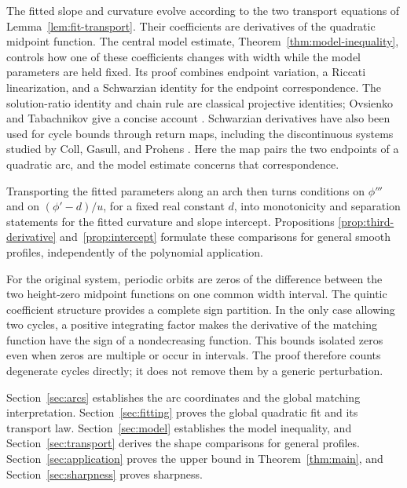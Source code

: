 The fitted slope and curvature evolve according to the two
transport equations of Lemma~\ref{lem:fit-transport}. Their
coefficients are derivatives of the quadratic midpoint function.
The central model estimate, Theorem~\ref{thm:model-inequality},
controls how one of these coefficients changes with width while
the model parameters are held fixed. Its proof combines endpoint
variation, a Riccati linearization, and a Schwarzian identity for
the endpoint correspondence. The solution-ratio identity and chain
rule are classical projective identities; Ovsienko and Tabachnikov
give a concise account \cite{OT}. Schwarzian derivatives have also
been used for cycle bounds through return maps, including the
discontinuous systems studied by Coll, Gasull, and Prohens
\cite{CGP}. Here the map pairs the two endpoints of a quadratic
arc, and the model estimate concerns that correspondence.

Transporting the fitted parameters along an arch then turns
conditions on $\phi'''$ and on $(\phi'-d)/u$, for a fixed real
constant $d$, into monotonicity and separation statements for the
fitted curvature and slope intercept. Propositions
\ref{prop:third-derivative} and~\ref{prop:intercept} formulate these
comparisons for general smooth profiles, independently of the
polynomial application.

For the original system, periodic orbits are zeros of the
difference between the two height-zero midpoint functions on
one common width interval. The quintic coefficient structure
provides a complete sign partition. In the only case allowing two
cycles, a positive integrating factor makes the derivative of
the matching function have the sign of a nondecreasing function.
This bounds isolated zeros even when zeros are multiple or occur
in intervals. The proof therefore counts degenerate cycles
directly; it does not remove them by a generic perturbation.

Section~\ref{sec:arcs} establishes the arc coordinates and the
global matching interpretation. Section~\ref{sec:fitting} proves the global quadratic fit and its
transport law. Section~\ref{sec:model} establishes the model
inequality, and Section~\ref{sec:transport} derives the shape
comparisons for general profiles. Section~\ref{sec:application} proves the upper bound in
Theorem~\ref{thm:main}, and Section~\ref{sec:sharpness} proves
sharpness.
